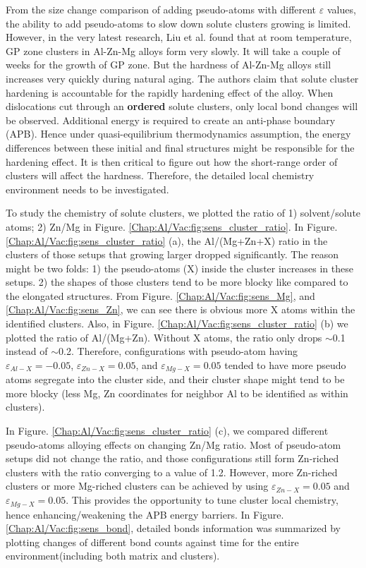 From the size change comparison of adding pseudo-atoms with different $\varepsilon$ values, the ability to add pseudo-atoms to slow down solute clusters growing is limited. However, in the very latest research, Liu et al. \cite{liu2020formation} found that at room temperature, \ac{GP} zone clusters in Al-Zn-Mg alloys form very slowly. It will take a couple of weeks for the growth of \ac{GP} zone. But the hardness of Al-Zn-Mg alloys still increases very quickly during natural aging. The authors claim that solute cluster hardening is accountable for the rapidly hardening effect of the alloy. When dislocations cut through an \textbf{ordered} solute clusters, only local bond changes will be observed. Additional energy is required to create an anti-phase boundary (APB). Hence under quasi-equilibrium thermodynamics assumption, the energy differences between these initial and final structures might be responsible for the hardening effect. It is then critical to figure out how the short-range order of clusters will affect the hardness. Therefore, the detailed local chemistry environment needs to be investigated.

To study the chemistry of solute clusters, we plotted the ratio of 1) solvent/solute atoms; 2) Zn/Mg in Figure. \ref{Chap:Al/Vac:fig:sens_cluster_ratio}. In Figure. \ref{Chap:Al/Vac:fig:sens_cluster_ratio} (a), the Al/(Mg+Zn+X) ratio in the clusters of those setups that growing larger dropped significantly. The reason might be two folds: 1) the pseudo-atoms (X) inside the cluster increases in these setups. 2) the shapes of those clusters tend to be more blocky like compared to the elongated structures. From Figure. \ref{Chap:Al/Vac:fig:sens_Mg}, and \ref{Chap:Al/Vac:fig:sens_Zn}, we can see there is obvious more X atoms within the identified clusters. Also, in Figure. \ref{Chap:Al/Vac:fig:sens_cluster_ratio} (b) we plotted the ratio of Al/(Mg+Zn). Without X atoms, the ratio only drops $\sim$0.1 instead of $\sim$0.2. Therefore, configurations with pseudo-atom having  $\varepsilon_{Al-X} = -0.05$, $\varepsilon_{Zn-X} = 0.05$, and $\varepsilon_{Mg-X} = 0.05$ tended to have more pseudo atoms segregate into the cluster side, and their cluster shape might tend to be more blocky (less Mg, Zn coordinates for neighbor Al to be identified as within clusters).

In Figure. \ref{Chap:Al/Vac:fig:sens_cluster_ratio} (c), we compared different pseudo-atoms alloying effects on changing Zn/Mg ratio. Most of pseudo-atom setups did not change the ratio, and those configurations still form Zn-riched clusters with the ratio converging to a value of 1.2. However, more Zn-riched clusters or more Mg-riched clusters can be achieved by using $\varepsilon_{Zn-X} = 0.05$ and $\varepsilon_{Mg-X} = 0.05$. This provides the opportunity to tune cluster local chemistry, hence enhancing/weakening the APB energy barriers. In Figure. \ref{Chap:Al/Vac:fig:sens_bond}, detailed bonds information was summarized by plotting changes of different bond counts against time for the entire environment(including both matrix and clusters). 

